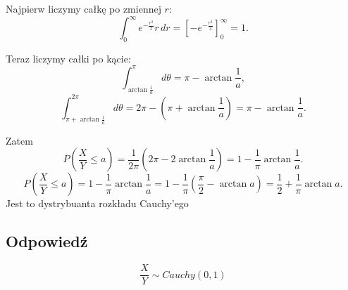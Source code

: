 Najpierw liczymy całkę po zmiennej \(r\):
\[
	\int_{0}^{\infty} e^{-\frac{r^2}{2}} r \, dr
	=
	\left[ -e^{-\frac{r^2}{2}} \right]_{0}^{\infty}
	=
	1.
\]

Teraz liczymy całki po kącie:
\[
	\int_{\arctan\frac{1}{a}}^{\pi} d\theta
	=
	\pi - \arctan\frac{1}{a},
\]
\[
	\int_{\pi + \arctan\frac{1}{a}}^{2\pi} d\theta
	=
	2\pi - \left(\pi + \arctan\frac{1}{a}\right)
	=
	\pi - \arctan\frac{1}{a}.
\]

Zatem
\[
	P\left(\frac{X}{Y} \le a\right)
	=
	\frac{1}{2\pi}
	\left(2\pi - 2\arctan\frac{1}{a}\right)
	=
	1 - \frac{1}{\pi}\arctan\frac{1}{a}.
\]
\[
	P\left(\frac{X}{Y} \le a\right)
	=
	1 - \frac{1}{\pi}\arctan\frac{1}{a} = 1-\frac{1}{\pi} \left(\frac{\pi}{2} -  \arctan{a} \right) = \frac{1}{2} + \frac{1}{\pi}\arctan{a} .
\]
Jest to dystrybuanta rozkładu Cauchy'ego

\subsection*{Odpowiedź}
\[
	\boxed{\frac{X}{Y} \sim Cauchy (0,1)}
\]
